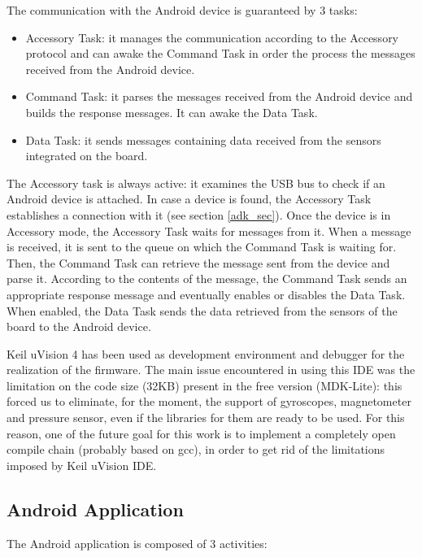 The communication with the Android device is guaranteed by 3 tasks:

\begin{itemize}
 	\item Accessory Task: it manages the communication according to the Accessory protocol and can awake the Command Task in order the process the messages received from the Android device.
	\item Command Task: it parses the messages received from the Android device and builds the response messages. It can awake the Data Task.
	\item Data Task: it sends messages containing data received from the sensors integrated on the board.
\end{itemize}  

The Accessory task is always active: it examines the USB bus to check if an Android device is attached. In case a device is found, the Accessory Task establishes a connection with it (see section \ref{adk_sec}). Once the device is in Accessory mode, the Accessory Task waits for messages from it. When a message is received, it is sent to the queue on which the Command Task is waiting for. Then, the Command Task can retrieve the message sent from the device and parse it. According to the contents of the message, the Command Task sends an appropriate response message and eventually enables or disables the Data Task. When enabled, the Data Task sends the data retrieved from the sensors of the board to the Android device.

Keil uVision 4 has been used as development environment and debugger for the realization of the firmware. The main issue encountered in using this IDE was the limitation on the code size (32KB) present in the free version (MDK-Lite): this forced us to eliminate, for the moment, the support of gyroscopes, magnetometer and pressure sensor, even if the libraries for them are ready to be used. For this reason, one of the future goal for this work is to implement a completely open compile chain (probably based on gcc), in order to get rid of the limitations imposed by Keil uVision IDE.

\subsection{Android Application}
\label{apk_sec}

The Android application is composed of 3 activities:

